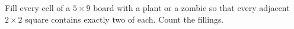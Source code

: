Fill every cell of a $5\times9$ board with a plant or a zombie so that every adjacent $2\times2$ square contains exactly two of each. Count the fillings.

